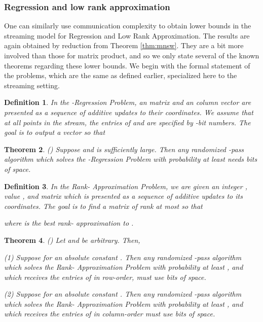 \documentclass[11pt]{article}
\newtheorem{theorem}{Theorem}
\newtheorem{definition}[theorem]{Definition}
\begin{document}
\subsubsection{Regression and low rank approximation}
One can similarly use communication complexity to obtain lower bounds in the streaming
model for Regression and Low Rank Approximation. The results are again obtained by reduction
from Theorem \ref{thm:mnsw}. They are a bit more involved than those for matrix product, and
so we only state several of the known theorems regarding these lower bounds. We begin with
the formal statement of the problems, which are the same as defined earlier, 
specialized here to the streaming setting. 

\begin{definition}
In the {\it -Regression Problem}, an  matrix  and an 
 column vector  are presented as a sequence of additive updates to their
coordinates. We assume that at all points in the stream, the entries of  and  
are specified by -bit 
numbers. The goal is to output a vector  so that

\end{definition}

\begin{theorem}(\cite{CW09})
Suppose  and  is sufficiently large. Then any 
randomized -pass algorithm which solves the -Regression Problem with 
probability at least  needs  bits of space.
\end{theorem}

\begin{definition}\label{prob:lowrank}
In the {\it Rank- Approximation Problem}, 
we are given an integer , value , and  matrix  which is presented
as a sequence of additive updates to its coordinates. The goal is to 
find a matrix  of rank at most  so that

where  is the best rank- approximation to .
\end{definition}

\begin{theorem}\label{thm:rankLB}(\cite{CW09})
Let  and  be arbitrary. Then, 

(1) Suppose  for an absolute constant . Then any
randomized -pass algorithm which solves the Rank- Approximation Problem with 
probability at least , and which receives
the entries of  in row-order, must use  bits of space.

(2) Suppose  for an absolute constant . Then any
randomized -pass algorithm which solves the Rank- Approximation Problem with
probability at least , and which receives
the entries of  in column-order must use  bits of space.

\end{theorem}
\end{document}
